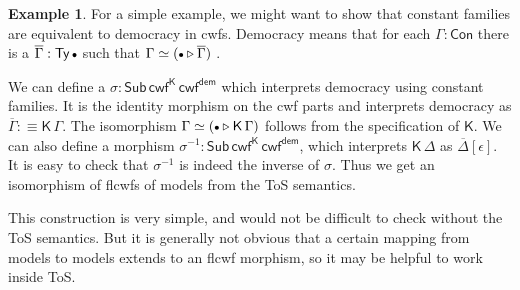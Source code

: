 \documentclass[12pt,a4paper,twoside,openany]{book}
\theoremstyle{remark}
\theoremstyle{definition}
\newtheorem{myexample}{Example}
\theoremstyle{theorem}
\newcommand{\ms}[1]{\mathsf{#1}}
\newcommand{\Con}{\mathsf{Con}}
\newcommand{\Sub}{\mathsf{Sub}}
\newcommand{\Ty}{\mathsf{Ty}}
\newcommand{\ext}{\triangleright}
\newcommand{\emptycon}{\scaleobj{.75}\bullet}
\newcommand{\K}{\mathsf{K}}
\newcommand{\defn}{:\equiv}
\begin{document}
\begin{myexample}
For a simple example, we might want to show that constant families are
equivalent to democracy in cwfs. Democracy means that for each $\Gamma : \Con$
there is a $\overline{\Gamma} : \Ty\,\emptycon$ such that $\Gamma \simeq
(\emptycon\ext\overline{\Gamma})$ \cite[Section~3.1]{flccc-undecidability}.

We can define a $\sigma : \Sub\,\ms{cwf^K}\,\ms{cwf^{dem}}$ which interprets
democracy using constant families. It is the identity morphism on the cwf parts
and interprets democracy as $\overline{\Gamma} \defn \ms{K}\,\Gamma$. The
isomorphism $\Gamma \simeq (\emptycon \ext \K\,\Gamma)$ follows from the
specification of $\K$. We can also define a morphism $\sigma^{-1} :
\Sub\,\ms{cwf^K}\,\ms{cwf^{dem}}$, which interprets $\K\,\Delta$ as
$\overline{\Delta}[\epsilon]$. It is easy to check that $\sigma^{-1}$ is indeed
the inverse of $\sigma$. Thus we get an isomorphism of flcwfs of models
from the ToS semantics.

This construction is very simple, and would not be difficult to check without
the ToS semantics. But it is generally not obvious that a certain mapping from
models to models extends to an flcwf morphism, so it may be helpful
to work inside ToS.
\end{myexample}
\end{document}
